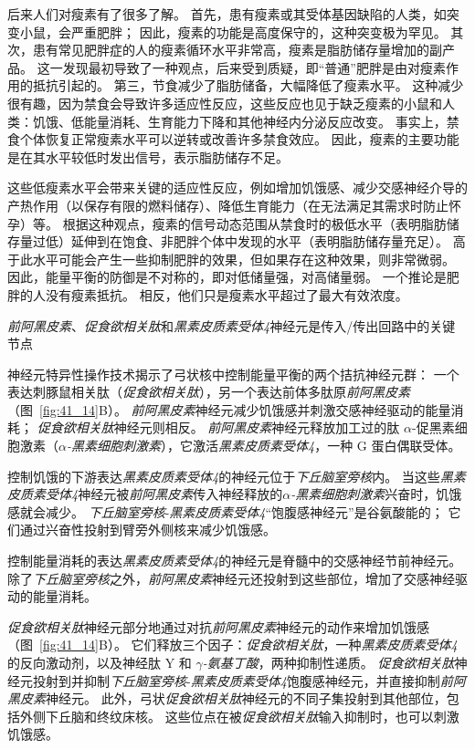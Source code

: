 后来人们对瘦素有了很多了解。
首先，患有瘦素或其受体基因缺陷的人类，如突变小鼠，会严重肥胖；
因此，瘦素的功能是高度保守的，这种突变极为罕见。
其次，患有常见肥胖症的人的瘦素循环水平非常高，瘦素是脂肪储存量增加的副产品。
这一发现最初导致了一种观点，后来受到质疑，即“普通”肥胖是由对瘦素作用的抵抗引起的。
第三，节食减少了脂肪储备，大幅降低了瘦素水平。
这种减少很有趣，因为禁食会导致许多适应性反应，这些反应也见于缺乏瘦素的小鼠和人类：饥饿、低能量消耗、生育能力下降和其他神经内分泌反应改变。
事实上，禁食个体恢复正常瘦素水平可以逆转或改善许多禁食效应。
因此，瘦素的主要功能是在其水平较低时发出信号，表示脂肪储存不足。


这些低瘦素水平会带来关键的适应性反应，例如增加饥饿感、减少交感神经介导的产热作用（以保存有限的燃料储存）、降低生育能力（在无法满足其需求时防止怀孕）等。
根据这种观点，瘦素的信号动态范围从禁食时的极低水平（表明脂肪储存量过低）延伸到在饱食、非肥胖个体中发现的水平（表明脂肪储存量充足）。
高于此水平可能会产生一些抑制肥胖的效果，但如果存在这种效果，则非常微弱。
因此，能量平衡的防御是不对称的，即对低储量强，对高储量弱。
一个推论是肥胖的人没有瘦素抵抗。
相反，他们只是瘦素水平超过了最大有效浓度。


\textit{前阿黑皮素}、\textit{促食欲相关肽}和\textit{黑素皮质素受体4}神经元是传入/传出回路中的关键节点

神经元特异性操作技术揭示了弓状核中控制能量平衡的两个拮抗神经元群：
一个表达刺豚鼠相关肽（\textit{促食欲相关肽}），另一个表达前体多肽原\textit{前阿黑皮素}（图~\ref{fig:41_14}B）。
\textit{前阿黑皮素}神经元减少饥饿感并刺激交感神经驱动的能量消耗；
\textit{促食欲相关肽}神经元则相反。
\textit{前阿黑皮素}神经元释放加工过的肽 $\alpha$-促黑素细胞激素（\textit{$\alpha$-黑素细胞刺激素}），它激活\textit{黑素皮质素受体4}，一种 G 蛋白偶联受体。


控制饥饿的下游表达\textit{黑素皮质素受体4}的神经元位于\textit{下丘脑室旁核}内。
当这些\textit{黑素皮质素受体4}神经元被\textit{前阿黑皮素}传入神经释放的\textit{$\alpha$-黑素细胞刺激素}兴奋时，饥饿感就会减少。
\textit{下丘脑室旁核}-\textit{黑素皮质素受体4}“饱腹感神经元”是谷氨酸能的；
它们通过兴奋性投射到臂旁外侧核来减少饥饿感。


控制能量消耗的表达\textit{黑素皮质素受体4}的神经元是脊髓中的交感神经节前神经元。
除了\textit{下丘脑室旁核}之外，\textit{前阿黑皮素}神经元还投射到这些部位，增加了交感神经驱动的能量消耗。


\textit{促食欲相关肽}神经元部分地通过对抗\textit{前阿黑皮素}神经元的动作来增加饥饿感（图~\ref{fig:41_14}B）。
它们释放三个因子：\textit{促食欲相关肽}，一种\textit{黑素皮质素受体4}的反向激动剂，以及神经肽 Y 和 \textit{$ \gamma $-氨基丁酸}，两种抑制性递质。
\textit{促食欲相关肽}神经元投射到并抑制\textit{下丘脑室旁核}-\textit{黑素皮质素受体4}饱腹感神经元，并直接抑制\textit{前阿黑皮素}神经元。
此外，弓状\textit{促食欲相关肽}神经元的不同子集投射到其他部位，包括外侧下丘脑和终纹床核。
这些位点在被\textit{促食欲相关肽}输入抑制时，也可以刺激饥饿感。


